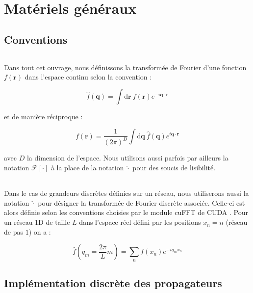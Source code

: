 \appendix
\appendixpage

\setcounter{chapter}{0}

\chapter{Matériels généraux}

\section{Conventions}

\label{sec:conv_fourier}

\subparagraph{}Dans tout cet ouvrage, nous définissons la transformée de Fourier d'une fonction $f(\mathbf{r})$ dans l'espace continu selon la convention :

\begin{equation}
	\hat{f}(\mathbf{q}) = \int \mathrm{d}\mathbf{r}~f(\mathbf{r})e^{-i\mathbf{q}\cdot\mathbf{r}}
\end{equation}

\noindent et de manière réciproque :

\begin{equation}
	f(\mathbf{r}) = \frac{1}{(2\pi)^D}\int \mathrm{d}\mathbf{q}~\hat{f}(\mathbf{q})e^{i\mathbf{q}\cdot\mathbf{r}}
\end{equation}

\noindent avec $D$ la dimension de l'espace. Nous utilisons aussi parfois par ailleurs la notation $\mathcal{F}[\cdot]$ à la place de la notation $\hat{\cdot}$ pour des soucis de lisibilité.

\subparagraph{}Dans le cas de grandeurs discrètes définies sur un réseau, nous utiliserons aussi la notation $\hat{\cdot}$ pour désigner la transformée de Fourier discrète associée. Celle-ci est alors définie selon les conventions choisies par le module cuFFT de CUDA \cite{cuda}. Pour un réseau 1D de taille $L$ dans l'espace réel défini par les positions $x_n = n$ (réseau de pas $1$) on a :

\begin{equation}
	\hat{f}(q_m = \frac{2\pi}{L}m) = \sum_{n} f(x_n)e^{-i q_m x_n}
	\label{eq:TFdisc}
\end{equation}

\section{Implémentation discrète des propagateurs}

